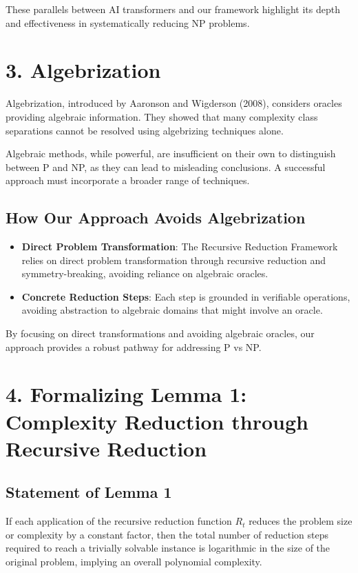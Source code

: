 \documentclass{article}
\begin{document}
These parallels between AI transformers and our framework highlight its depth and effectiveness in systematically reducing NP problems.

\section*{3. Algebrization}
Algebrization, introduced by Aaronson and Wigderson (2008), considers oracles providing algebraic information. They showed that many complexity class separations cannot be resolved using algebrizing techniques alone.

Algebraic methods, while powerful, are insufficient on their own to distinguish between P and NP, as they can lead to misleading conclusions. A successful approach must incorporate a broader range of techniques.

\subsection*{How Our Approach Avoids Algebrization}
\begin{itemize}
    \item \textbf{Direct Problem Transformation}: The Recursive Reduction Framework relies on direct problem transformation through recursive reduction and symmetry-breaking, avoiding reliance on algebraic oracles.
    \item \textbf{Concrete Reduction Steps}: Each step is grounded in verifiable operations, avoiding abstraction to algebraic domains that might involve an oracle.
\end{itemize}

By focusing on direct transformations and avoiding algebraic oracles, our approach provides a robust pathway for addressing P vs NP.

\section*{4. Formalizing Lemma 1: Complexity Reduction through Recursive Reduction}
\subsection*{Statement of Lemma 1}
If each application of the recursive reduction function $R_t$ reduces the problem size or complexity by a constant factor, then the total number of reduction steps required to reach a trivially solvable instance is logarithmic in the size of the original problem, implying an overall polynomial complexity.
\end{document}

